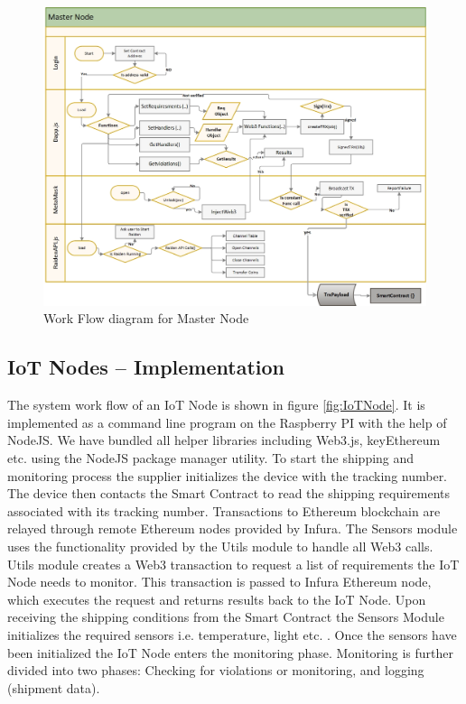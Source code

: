 \begin{figure}[h]
	\centering
    \includegraphics[width=175mm,scale=1]{figs/master-workflow}
	\caption{Work Flow diagram for Master Node}
	\label{fig:master-workflow} 
\end{figure}
\clearpage
\vspace{0.5cm}
\subsection{IoT Nodes – Implementation} \label{IoT-Nodes} 
The system work flow of an IoT Node is shown in figure \ref{fig:IoTNode}. It is implemented as a command line program on the Raspberry PI with the help of NodeJS. We have bundled all helper libraries including Web3.js, keyEthereum etc. using the NodeJS package manager utility. To start the shipping and monitoring process the supplier initializes the device with the tracking number. The device then contacts the Smart Contract to read the shipping requirements associated with its tracking number. Transactions to Ethereum blockchain are relayed through remote Ethereum nodes provided by Infura. The Sensors module uses the functionality provided by the Utils module to handle all Web3 calls. Utils module creates a Web3 transaction to request a list of requirements the IoT Node needs to monitor. This transaction is passed to Infura Ethereum node, which executes the request and returns results back to the IoT Node. Upon receiving the shipping conditions from the Smart Contract the Sensors Module initializes the required sensors i.e. temperature, light etc. . Once the sensors have been initialized the IoT Node enters the monitoring phase.  Monitoring is further divided into two phases: Checking for violations or monitoring, and logging (shipment data).

